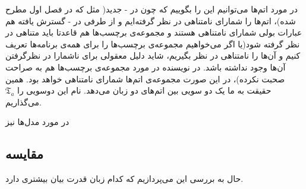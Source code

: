 در مورد اتم‌ها می‌توانیم این را بگوییم که چون در - جدید( مثل  که در فصل اول مطرح شده)، اتم‌ها را شمارای نامتناهی در نظر گرفته‌ایم و از طرفی در - گسترش یافته هم عبارات بولی شمارای نامتناهی هستند و مجموعه‌ی برچسب‌ها هم قاعدتا باید متناهی در نظر گرفته شود(‌یا اگر می‌خواهیم مجموعه‌ی برچسب‌ها را برای همه‌ی برنامه‌ها تعریف کنیم و آن‌ها را نامتناهی در نظر بگیریم، شاید دلیل معقولی برای ناشمارا در نظرگرفتن آن‌ها وجود نداشته باشد. در \cite{calcul} نویسنده در مورد مجموعه‌ی برچسب‌ها هم به صراحت صحبت نکرده)، در این صورت مجموعه‌ی اتم‌ها شمارای نامتناهی خواهد بود. همین حقیقت به ما یک دو سویی بین اتم‌های دو زبان می‌دهد. نام این دوسویی را 
$\mathfrak{T}_a$
می‌گذاریم.

در مورد مدل‌ها نیز 

\subsection{مقایسه}

حال به بررسی این می‌پردازیم که کدام زبان قدرت بیان بیشتری دارد.

